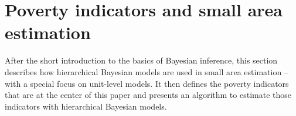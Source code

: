 \section{Poverty indicators and small area estimation}

After the short introduction to the basics of Bayesian inference, this section describes how hierarchical Bayesian models are used in small area estimation – with a special focus on unit-level models.
It then defines the poverty indicators that are at the center of this paper and presents an algorithm to estimate those indicators with hierarchical Bayesian models.


%


